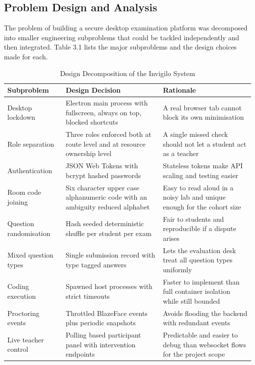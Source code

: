 \documentclass[12pt, a4paper]{report}
\begin{document}
\subsection{Problem Design and Analysis}

\begin{justify}
  {\fontsize{12}{18}\selectfont
    The problem of building a secure desktop examination platform was decomposed into smaller engineering subproblems that could be tackled independently and then integrated. Table 3.1 lists the major subproblems and the design choices made for each.
  }
\end{justify}

\begin{table}[H]
  \caption{Design Decomposition of the Invigilo System}
  \label{tab:3.1}
  \centering
  {\fontsize{10}{14}\selectfont
    \begin{tabular}{|p{1.5in}|p{1.7in}|p{2in}|}
      \hline
      \textbf{Subproblem} & \textbf{Design Decision} & \textbf{Rationale} \\
      \hline
      Desktop lockdown & Electron main process with fullscreen, always on top, blocked shortcuts & A real browser tab cannot block its own minimisation \\
      \hline
      Role separation & Three roles enforced both at route level and at resource ownership level & A single missed check should not let a student act as a teacher \\
      \hline
      Authentication & JSON Web Tokens with bcrypt hashed passwords & Stateless tokens make API scaling and testing easier \\
      \hline
      Room code joining & Six character upper case alphanumeric code with an ambiguity reduced alphabet & Easy to read aloud in a noisy lab and unique enough for the cohort size \\
      \hline
      Question randomisation & Hash seeded deterministic shuffle per student per exam & Fair to students and reproducible if a dispute arises \\
      \hline
      Mixed question types & Single submission record with type tagged answers & Lets the evaluation desk treat all question types uniformly \\
      \hline
      Coding execution & Spawned host processes with strict timeouts & Faster to implement than full container isolation while still bounded \\
      \hline
      Proctoring events & Throttled BlazeFace events plus periodic snapshots & Avoids flooding the backend with redundant events \\
      \hline
      Live teacher control & Polling based participant panel with intervention endpoints & Predictable and easier to debug than websocket flows for the project scope \\
      \hline
    \end{tabular}
  }
\end{table}
\end{document}

